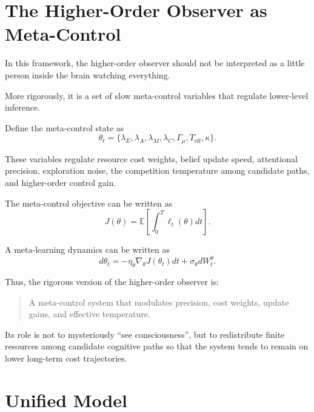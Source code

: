 \documentclass[11pt, a4paper]{article}
\begin{document}
\section{The Higher-Order Observer as Meta-Control}

In this framework, the higher-order observer should not be interpreted as a little person inside the brain watching everything.

More rigorously, it is a set of slow meta-control variables that regulate lower-level inference.

Define the meta-control state as
\begin{equation}
\theta_t
=
\{
\lambda_E,
\lambda_A,
\lambda_M,
\lambda_C,
\Gamma_\mu,
T_{\text{eff}},
\kappa
\}.
\end{equation}

These variables regulate resource cost weights, belief update speed, attentional precision, exploration noise, the competition temperature among candidate paths, and higher-order control gain.

The meta-control objective can be written as
\begin{equation}
J(\theta)
=
\mathbb{E}
\left[
\int_0^T
\ell_t(\theta)dt
\right].
\end{equation}

A meta-learning dynamics can be written as
\begin{equation}
d\theta_t
=
-\eta_\theta\nabla_\theta J(\theta_t)dt
+
\sigma_\theta dW_t^\theta.
\end{equation}

Thus, the rigorous version of the higher-order observer is:
\begin{quote}
A meta-control system that modulates precision, cost weights, update gains, and effective temperature.
\end{quote}

Its role is not to mysteriously ``see consciousness'', but to redistribute finite resources among candidate cognitive paths so that the system tends to remain on lower long-term cost trajectories.

\section{Unified Model}
\end{document}
